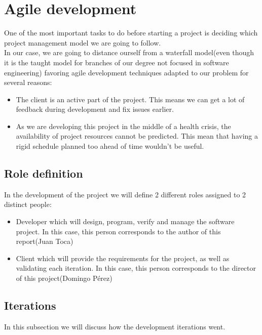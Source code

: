 \section{Agile development}

    One of the most important tasks to do before starting a project is deciding
    which project management model we are going to follow.\\

    In our case, we are going to distance ourself from a waterfall model(even
    though it is the taught model for branches of our degree not focused in
    software engineering) favoring agile development techniques adapted to our
    problem for several reasons:
    \begin{itemize}
      \item The client is an active part of the project. This means we can get
      a lot of feedback during development and fix issues earlier.
      \item As we are developing this project in the middle of a health crisis,
      the availability of project resources cannot be predicted. This mean
      that having a rigid schedule planned too ahead of time wouldn't be
      useful.
    \end{itemize}

    \subsection{Role definition}

    In the development of the project we will define 2 different roles assigned
    to 2 distinct people:
    \begin{itemize}
      \item Developer which will design, program, verify and manage the
      software project. In this case, this person corresponds to the author of
      this report(Juan Toca)
      \item Client which will provide the requirements for the project, as well
      as validating each iteration. In this case, this person corresponds to
      the director of this project(Domingo Pérez)
    \end{itemize}

    \subsection{Iterations}

      In this subsection we will discuss how the development iterations went.\\

